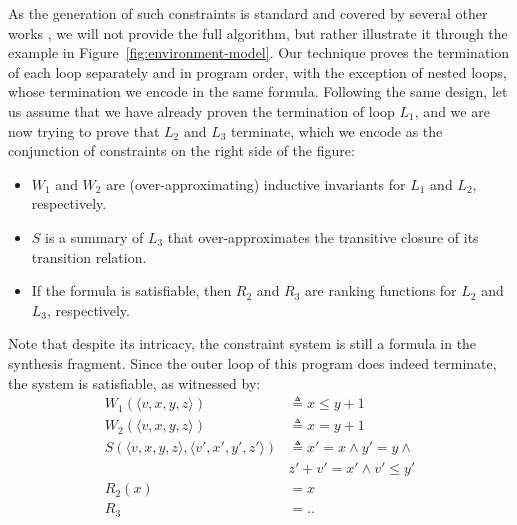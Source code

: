 \documentclass[preprint]{sigplanconf}
\theoremstyle{definition}
\begin{document}
As the generation of such constraints is standard and covered by several other works \cite{DBLP:conf/pldi/GrebenshchikovLPR12,DBLP:conf/pldi/GulwaniSV08}, 
we will not provide the full algorithm, but rather illustrate it through the example in Figure~\ref{fig:environment-model}.
Our technique proves the termination of each loop separately and in program order, 
with the exception of nested loops, whose termination we encode in the same formula.
Following the same design, let us assume that we have already proven the termination of loop $L_1$, and we are now trying to prove that $L_2$ and $L_3$ terminate, which we encode
as the conjunction of constraints on the right side of the figure:
\begin{itemize}
\item $W_1$ and $W_2$ are (over-approximating) inductive invariants for $L_1$ and $L_2$, respectively.
\item $S$ is a summary of $L_3$ that over-approximates the transitive closure of its transition relation.
\item If the formula is satisfiable, then $R_2$ and $R_3$ are ranking functions for $L_2$ and $L_3$, respectively.
\end{itemize}


Note that despite its intricacy, the constraint system is still a formula in the synthesis fragment.
Since the outer loop of this program does indeed terminate, the system is satisfiable, as witnessed by:
\begin{align*}
W_1(\langle v, x, y, z \rangle ) & \triangleq x \leq y + 1 \\
W_2(\langle v, x, y, z \rangle ) & \triangleq x = y + 1 \\
S(\langle v, x, y, z \rangle, \langle v', x', y', z' \rangle) & \triangleq x ' = x \wedge y' = y \wedge \\
& z' + v' = x' \wedge v' \leq y' \\
R_2(x) & = x\\
R_3 & = ..
\end{align*}
\end{document}
